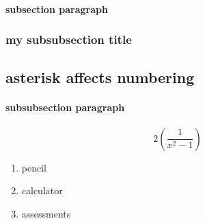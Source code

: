 \paragraph*{
    subsection paragraph
}
\subsubsection*{
    my subsubsection title
}

\subsection*{
    asterisk affects numbering
}

\paragraph*{
    subsubsection paragraph
}

% 
%
%

$$2\left(\frac{1}{x^2-1}\right)$$

\begin{enumerate}
    \item pencil
    \item calculator
    \item assessments
\end{enumerate}

